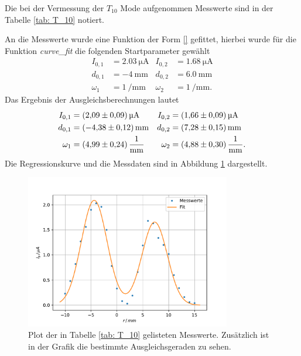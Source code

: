 Die bei der Vermessung der $T_{10}$ Mode aufgenommen Messwerte sind in der Tabelle
\ref{tab: T_10} notiert.

An die Messwerte wurde eine Funktion der Form \eqref{} gefittet, hierbei wurde für
die Funktion \emph{curve\_fit} die folgenden Startparameter gewählt
\begin{align*}
  I_{0,1}&=\SI{2.03}{\micro\ampere} & I_{0,2}&=\SI{1.68}{\micro\ampere}\\
  d_{0,1}&=\SI{-4}{\milli\meter}& d_{0,2}&=\SI{6.0}{\milli\meter} \\
  \omega_1&=\SI{1}{\per\milli\meter} &   \omega_2&=\SI{1}{\per\milli\meter}.
\end{align*}
Das Ergebnis der Ausgleichsberechnungen lautet
\begin{align*}
  I_{0,1}&=\SI{2.09\pm0.09}{\micro\ampere} & I_{0,2}&=\SI{1.66\pm0.09}{\micro\ampere}\\
  d_{0,1}&=\SI{-4.38\pm0.12}{\milli\meter}& d_{0,2}&=\SI{7.28\pm0.15}{\milli\meter} \\
  \omega_1&=\SI{4.99\pm0.24}{\per\milli\meter} &   \omega_2&=\SI{4.88\pm0.30}{\per\milli\meter}.
\end{align*}
Die Regressionskurve und die Messdaten sind in Abbildung \ref{fig: T_10} dargestellt.
\begin{figure}[h]
  \centering
  \includegraphics[width=0.8\textwidth]{../Messdaten/plots/T_10.pdf}
  \caption{Plot der in Tabelle \ref{tab: T_10} gelisteten Messwerte. Zusätzlich ist in der Grafik die bestimmte Ausgleichsgeraden zu sehen.}
  \label{fig: T_10}
\end{figure}
